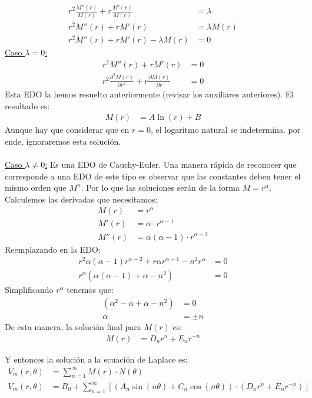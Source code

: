 \documentclass[
  11pt,
  letterpaper,
   answers
  ]{exam}
\begin{document}
\begin{questions}
\begin{solution}
\begin{parts}
\begin{align}
    r^2\frac{M''(r)}{M(r)} + r\frac{M'(r)}{M(r)} &= \lambda \\
    r^2 M''(r) + r M'(r) &= \lambda M(r) \\
    r^2 M''(r) + r M'(r) - \lambda M(r) &= 0
\end{align}
\underline{Caso $\lambda = 0$:}
\begin{align}
    r^2 M''(r) + r M'(r) &= 0 \\
    r^2 \frac{\partial ^2M(r)}{\partial r ^2} + r \frac{\partial M(r)}{\partial r} &= 0
\end{align}
    Esta EDO la hemos resuelto anteriormente (revisar los auxiliares anteriores). El resultado es:
    \begin{align}
        M(r) &= A \ln{(r)} + B
    \end{align}
    Aunque hay que considerar que en $r=0$, el logaritmo natural se indetermina. por ende, ignoraremos esta solución.
    \\
    \\
    \underline{Caso $\lambda \neq 0$:}
    Es una EDO de Cauchy-Euler. Una manera rápida de reconocer que corresponde a una EDO de este tipo es observar que las constantes deben tener el mismo orden que $M^n$. Por lo que las soluciones serán de la forma $M = r^{\alpha}$. Calculemos las derivadas que necesitamos:
    \begin{align}
        M(r) &= r^{\alpha} \\
        M'(r) &= \alpha \cdot r^{\alpha - 1} \\
        M''(r) &= \alpha (\alpha - 1) \cdot r^{\alpha - 2}
    \end{align}
    Reemplazando en la EDO:
    \begin{align}
        r^{2}\alpha(\alpha-1)r^{\alpha-2} + r \alpha r^{\alpha-1} - n^{2}r^{\alpha} &= 0\\
        r^{\alpha}( \alpha(\alpha -1) + \alpha - n^{2}) &= 0
    \end{align}
    Simplificando $r^{\alpha}$ tenemos que:
    \begin{align}
        (\alpha^2 - \alpha + \alpha - n^{2}) &= 0\\
        \alpha &= \pm n
    \end{align}
    De esta manera, la solución final para $M(r)$ es:
    \begin{align}
        M(r) &= D_n r^n + E_n r^{-n}
    \end{align}

    Y entonces la solución a la ecuación de Laplace es:
    \begin{align}
        V_m(r, \theta) &= \sum_{n=1}^\infty M(r) \cdot N(\theta) \\
        V_m(r, \theta) &= B_0 +\sum_{n=1}^\infty \left[(A_n \sin (n \theta) + C_n \cos(n \theta)) \cdot (D_n r^n + E_n r^{-n})\right]
    \end{align}


\end{parts}
\end{solution}
\end{questions}
\end{document}
